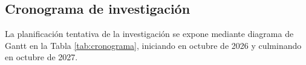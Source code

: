 \subsection{Cronograma de investigación}\label{sec:cronograma}

La planificación tentativa de la investigación se expone mediante diagrama de Gantt en la Tabla \ref{tab:cronograma}, iniciando en octubre de 2026 y culminando en octubre de 2027.



